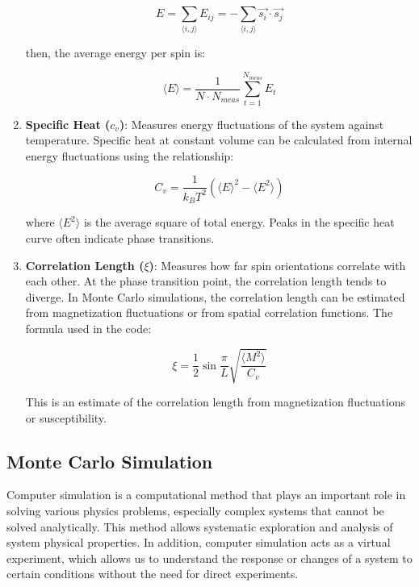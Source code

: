 \begin{enumerate}
\begin{equation}
E = \sum_{\langle i,j \rangle} E_{ij} = -\sum_{\langle i,j \rangle} \vec{s_i} \cdot \vec{s_j}
\label{eq:energy}
\end{equation}

then, the average energy per spin is:

\begin{equation}
\langle E \rangle = \frac{1}{N \cdot N_{meas}} \sum_{t=1}^{N_{meas}} E_t
\label{eq:avg_energy}
\end{equation}

\item \textbf{Specific Heat ($c_v$)}: Measures energy fluctuations of the system against temperature. Specific heat at constant volume can be calculated from internal energy fluctuations using the relationship:

\begin{equation}
C_v = \frac{1}{k_B T^2}(\langle E \rangle^2 - \langle E^2 \rangle)
\label{eq:specific_heat}
\end{equation}

where $\langle E^2 \rangle$ is the average square of total energy. Peaks in the specific heat curve often indicate phase transitions.

\item \textbf{Correlation Length ($\xi$)}: Measures how far spin orientations correlate with each other. At the phase transition point, the correlation length tends to diverge. In Monte Carlo simulations, the correlation length can be estimated from magnetization fluctuations or from spatial correlation functions. The formula used in the code:

\begin{equation}
\xi = \frac{1}{2} \sin \frac{\pi}{L} \sqrt{\frac{\langle M^2 \rangle}{C_v}}
\label{eq:correlation_length}
\end{equation}

This is an estimate of the correlation length from magnetization fluctuations or susceptibility.
\end{enumerate}

\subsection{Monte Carlo Simulation}

Computer simulation is a computational method that plays an important role in solving various physics problems, especially complex systems that cannot be solved analytically. This method allows systematic exploration and analysis of system physical properties. In addition, computer simulation acts as a virtual experiment, which allows us to understand the response or changes of a system to certain conditions without the need for direct experiments.

